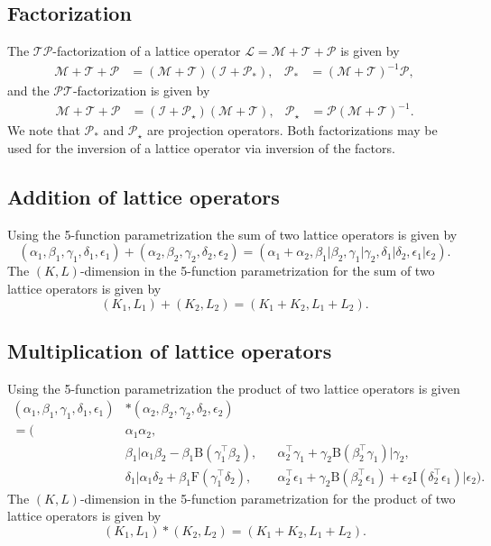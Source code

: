 \documentclass[12pt,a4paper]{article}
\newcommand{\Iop}{\mathcal{I}}
\newcommand{\Mop}{\mathcal{M}}
\newcommand{\Top}{\mathcal{T}}
\newcommand{\Pop}{\mathcal{P}}
\newcommand{\Lop}{\mathcal{L}}
\begin{document}
\subsection{Factorization}

The $\Top\Pop$-factorization of a lattice operator $\Lop = \Mop + \Top + \Pop$ is given by
\begin{align*}
\Mop + \Top + \Pop &= (\Mop + \Top) (\Iop+\Pop_*), &
\Pop_* &= (\Mop+\Top)^{-1} \Pop,
\end{align*}
and the $\Pop\Top$-factorization is given by
\begin{align*}
\Mop + \Top + \Pop &= (\Iop + \Pop_\star) (\Mop+\Top), &
\Pop_\star &= \Pop (\Mop+\Top)^{-1} .
\end{align*}
We note that $\Pop_*$ and $\Pop_\star$ are projection operators. Both factorizations may be used for the inversion of a lattice operator via inversion of the factors.


\subsection{Addition of lattice operators}

Using the 5-function parametrization the sum of two lattice operators is given by
\begin{equation*}
(\alpha_1,\beta_1,\gamma_1,\delta_1,\epsilon_1) + (\alpha_2,\beta_2,\gamma_2,\delta_2,\epsilon_2) = (\alpha_1+\alpha_2, \beta_1\vert\beta_2, \gamma_1\vert\gamma_2, \delta_1\vert\delta_2, \epsilon_1\vert\epsilon_2).
\end{equation*}
The $(K,L)$-dimension in the 5-function parametrization for the sum of two lattice operators is given by
\begin{equation*}
(K_1,L_1) + (K_2,L_2) = (K_1+K_2,L_1+L_2).
\end{equation*}

\subsection{Multiplication of lattice operators}

Using the 5-function parametrization the product of two lattice operators is given
\begin{align*}
(\alpha_1,\beta_1,\gamma_1,\delta_1,\epsilon_1) &* (\alpha_2,\beta_2,\gamma_2,\delta_2,\epsilon_2) \\
= \Big(& \alpha_1 \alpha_2, \\
& \beta_1 \big\vert \alpha_1 \beta_2 - \beta_1 \mathrm{B}(\gamma_1^\top \beta_2), &
& \alpha_2^\top \gamma_1 + \gamma_2 \mathrm{B}(\beta_2^\top \gamma_1) \big\vert \gamma_2, \\
& \delta_1 \big\vert \alpha_1 \delta_2 + \beta_1 \mathrm{F}(\gamma_1^\top \delta_2), &
& \alpha_2^\top \epsilon_1 + \gamma_2 \mathrm{B}(\beta_2^\top \epsilon_1) + \epsilon_2 \mathrm{I}(\delta_2^\top \epsilon_1) \big\vert \epsilon_2
\Big).
\end{align*}
The $(K,L)$-dimension in the 5-function parametrization for the product of two lattice operators is given by
\begin{equation*}
(K_1,L_1) * (K_2,L_2) = (K_1+K_2,L_1+L_2).
\end{equation*}
\end{document}
